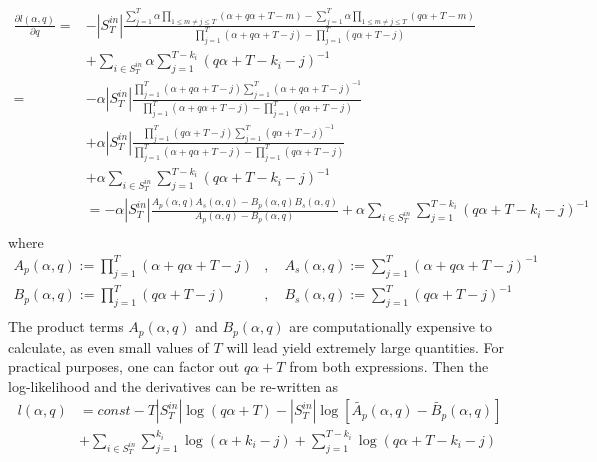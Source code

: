 \documentclass[a4paper, 12pt]{article}
\newcommand{\sint}{|S^{in}_T|}
\begin{document}
\begin{align} \label{eq:6}
    \frac{\partial l(\alpha, q)}{\partial q} =& -\sint \frac{\sum_{j = 1}^{T} \alpha \prod_{1 \leq m \neq j \leq T} (\alpha + q\alpha + T - m) - \sum_{j = 1}^{T} \alpha \prod_{1 \leq m \neq j \leq T} (q\alpha + T - m)}{\prod_{j = 1}^{T} (\alpha + q\alpha + T - j) - \prod_{j=1}^T (q\alpha + T - j)}\nonumber \\
    &+ \sum_{i \in S_T^{in}} \alpha \sum_{j = 1}^{T - k_i} (q\alpha + T - k_i - j)^{-1} \nonumber \\
    =& -\alpha\sint \frac{ \prod_{j = 1}^{T} (\alpha + q\alpha + T - j) \sum_{j = 1}^{T} (\alpha + q\alpha + T - j)^{-1} }{\prod_{j = 1}^{T} (\alpha + q\alpha + T - j) - \prod_{j=1}^T (q\alpha + T - j)} \nonumber \\
    &+ \alpha|S_T^{in}| \frac{\prod_{j = 1}^{T} (q\alpha + T - j) \sum_{j = 1}^{T} (q\alpha + T - j)^{-1}  }{ \prod_{j = 1}^{T} (\alpha + q\alpha + T - j) - \prod_{j=1}^T (q\alpha + T - j)} \nonumber \\
    &+ \alpha \sum_{i \in S_T^{in}} \sum_{j = 1}^{T - k_i} (q\alpha + T - k_i - j)^{-1} \nonumber \\
    &= -\alpha \sint \frac{ A_p(\alpha, q) A_s(\alpha, q) - B_p(\alpha, q) B_s(\alpha, q)  }{ A_p(\alpha, q) - B_p(\alpha, q)} + \alpha \sum_{i \in S_T^{in}} \sum_{j = 1}^{T - k_i} (q\alpha + T - k_i - j)^{-1} \nonumber \\
\end{align}
where
\begin{align*}
A_p(\alpha, q) := \prod_{j = 1}^{T} (\alpha + q\alpha + T - j) &,\quad A_s(\alpha, q) := \sum_{j = 1}^{T} (\alpha + q\alpha + T - j)^{-1} \\
B_p(\alpha, q) := \prod_{j = 1}^{T} (q\alpha + T - j) &,\quad B_s(\alpha, q) := \sum_{j = 1}^{T} (q\alpha + T - j)^{-1} \\
\end{align*}
The product terms $A_p(\alpha, q)$ and $B_p(\alpha, q)$ are computationally expensive to calculate, as even small values of $T$ will lead yield extremely large quantities. For practical purposes, one can factor out $q\alpha + T$ from both expressions. Then the log-likelihood and the derivatives can be re-written as
\begin{align*}
    l(\alpha, q) &= const - T|S_T^{in}| \log(q\alpha + T) - \sint \log\left[ \widetilde{A_p}(\alpha, q) - \widetilde{B_p}(\alpha, q) \right] \nonumber \\
    &+ \sum_{i \in S_T^{in}} \sum_{j = 1}^{k_i} \log(\alpha + k_i - j) + \sum_{j = 1}^{T - k_i} \log(q\alpha + T - k_i - j) \nonumber \\
\end{align*}
\end{document}
